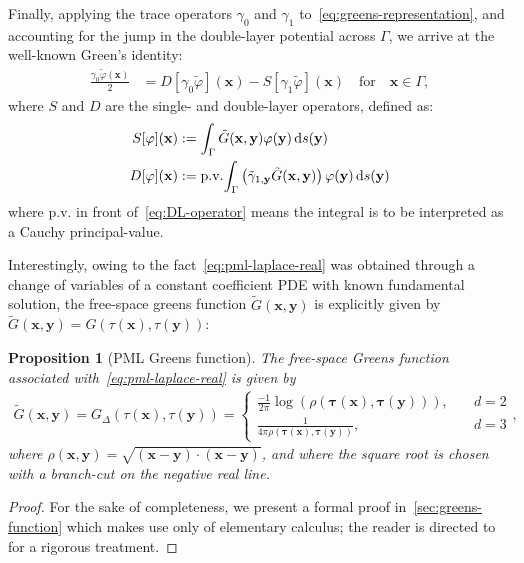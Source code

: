 \documentclass[11pt]{article}
\newcommand{\bx}{\mathbf{x}}
\newcommand{\btau}{\mathbf{\tau}}
\newcommand{\by}{\mathbf{y}}
\newcommand{\de}{\,\mathrm{d}}
\newcommand{\tvarphi}{\tilde \varphi}
\newtheorem{proposition}[theorem]{Proposition}
\begin{document}
Finally, applying the trace operators $\gamma_0$ and $\gamma_1$
to~\cref{eq:greens-representation}, and accounting for the jump in the
double-layer potential across $\Gamma$, we arrive at the well-known Green's
identity:
\begin{align}
  \label{eq:greens-formula}
  \frac{\gamma_0 \tvarphi(\bx)}{2} &=  D[\gamma_0 \tvarphi](\bx) - S[{\gamma}_1 \tvarphi](\bx) \quad \mbox{for} \quad \bx \in \Gamma,
\end{align}
where $S$ and $D$ are the single- and double-layer operators,
defined as:
\begin{subequations}
  \label{eq:calderon-operators}
  \begin{align}
  \label{eq:SL-operator}  
  S[\varphi](\bx) &:= \int_\Gamma \tilde{G}(\bx,\by) \varphi(\by) \de s(\by)\\
  \label{eq:DL-operator}  
  D[\varphi](\bx) &:= {\rm p.v.}\! \int_\Gamma\left(\tilde{\gamma}_{1,\by}\tilde{G}(\bx,\by)\right)
  \varphi(\by) \de s(\by)
\end{align}\label{eq:BIOS}\end{subequations}
where p.v. in front of~\cref{eq:DL-operator} means the integral is to be
interpreted as a Cauchy principal-value.

Interestingly, owing to the fact~\cref{eq:pml-laplace-real} was obtained
through a change of variables of a constant coefficient PDE with known
fundamental solution, the free-space greens function $\tilde{G}(\bx,\by)$ is explicitly given by $\tilde{G}(\bx,\by) = G(\tau(\bx),\tau(\by))$:
\begin{proposition}[PML Greens function]
  The free-space Greens function associated with~\cref{eq:pml-laplace-real} is
  given by
  \begin{align}
  \tilde{G}(\bx,\by) = G_{\Delta}(\tau(\bx),\tau(\by)) = 
    \begin{cases}
        \frac{-1}{2\pi}\log(\rho(\btau(\bx),\btau(\by))),\quad &d=2 \\
        \frac{1}{4\pi\rho(\btau(\bx),\btau(\by))}, \quad &d=3
    \end{cases},
  \end{align}
  where $\rho(\bx,\by) = \sqrt{(\bx-\by)\cdot(\bx-\by)}$, and where the square
  root is chosen with a branch-cut on the negative real line.
\end{proposition}
\begin{proof}
  For the sake of completeness, we present a formal proof
  in~\cref{sec:greens-function} which makes use only of elementary calculus; the
  reader is directed to \cite{kim2010analysis} for a rigorous treatment. 
\end{proof}
\end{document}
